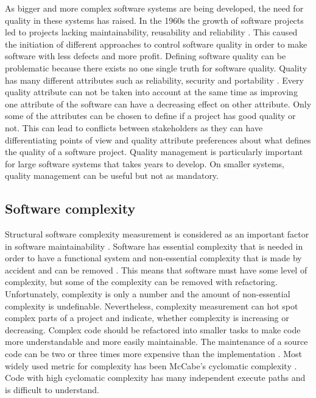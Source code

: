 As bigger and more complex software systems are being developed, the need for quality in these systems has raised. In the 1960s the growth of software projects led to projects lacking maintainability, reusability and reliability \cite{sommerville2011software}. This caused the initiation of different approaches to control software quality in order to make software with less defects and more profit. Defining software quality can be problematic because there exists no one single truth for software quality. Quality has many different attributes such as reliability, security and portability \cite{sommerville2011software}. Every quality attribute can not be taken into account at the same time as improving one attribute of the software can have a decreasing effect on other attribute. Only some of the attributes can be chosen to define if a project has good quality or not. This can lead to conflicts between stakeholders as they can have differentiating points of view and quality attribute preferences about what defines the quality of a software project. Quality management is particularly important for large software systems that takes years to develop. On smaller systems, quality management can be useful but not as mandatory.

\subsection{Software complexity}
\label{chap:complexity}

Structural software complexity measurement is considered as an important factor in software maintainability \cite{banker1989software}. Software has essential complexity that is needed in order to have a functional system and non-essential complexity that is made by accident and can be removed \cite{softcomplex2014}. This means that software must have some level of complexity, but some of the complexity can be removed with refactoring. Unfortunately, complexity is only a number and the amount of non-essential complexity is undefinable. Nevertheless, complexity measurement can hot spot complex parts of a project and indicate, whether complexity is increasing or decreasing. Complex code should be refactored into smaller tasks to make code more understandable and more easily maintainable.  The maintenance of a source code can be two or three times more expensive than the implementation \cite{banker1989software}. Most widely used metric for complexity has been McCabe’s cyclomatic complexity \cite{banker1989software}. Code with high cyclomatic complexity has many independent execute paths and is difficult to understand. 



